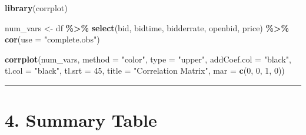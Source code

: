 \documentclass[
]{article}
\newenvironment{Shaded}{\begin{snugshade}}{\end{snugshade}}
\newcommand{\AttributeTok}[1]{\textcolor[rgb]{0.13,0.29,0.53}{#1}}
\newcommand{\DecValTok}[1]{\textcolor[rgb]{0.00,0.00,0.81}{#1}}
\newcommand{\FunctionTok}[1]{\textcolor[rgb]{0.13,0.29,0.53}{\textbf{#1}}}
\newcommand{\NormalTok}[1]{#1}
\newcommand{\OtherTok}[1]{\textcolor[rgb]{0.56,0.35,0.01}{#1}}
\newcommand{\SpecialCharTok}[1]{\textcolor[rgb]{0.81,0.36,0.00}{\textbf{#1}}}
\newcommand{\StringTok}[1]{\textcolor[rgb]{0.31,0.60,0.02}{#1}}
\begin{document}
\begin{Shaded}
\begin{Highlighting}[]
\FunctionTok{library}\NormalTok{(corrplot)}

\NormalTok{num\_vars }\OtherTok{\textless{}{-}}\NormalTok{ df }\SpecialCharTok{\%\textgreater{}\%}
  \FunctionTok{select}\NormalTok{(bid, bidtime, bidderrate, openbid, price) }\SpecialCharTok{\%\textgreater{}\%}
  \FunctionTok{cor}\NormalTok{(}\AttributeTok{use =} \StringTok{"complete.obs"}\NormalTok{)}

\FunctionTok{corrplot}\NormalTok{(num\_vars,}
         \AttributeTok{method  =} \StringTok{"color"}\NormalTok{,}
         \AttributeTok{type    =} \StringTok{"upper"}\NormalTok{,}
         \AttributeTok{addCoef.col =} \StringTok{"black"}\NormalTok{,}
         \AttributeTok{tl.col  =} \StringTok{"black"}\NormalTok{,}
         \AttributeTok{tl.srt  =} \DecValTok{45}\NormalTok{,}
         \AttributeTok{title   =} \StringTok{"Correlation Matrix"}\NormalTok{,}
         \AttributeTok{mar     =} \FunctionTok{c}\NormalTok{(}\DecValTok{0}\NormalTok{, }\DecValTok{0}\NormalTok{, }\DecValTok{1}\NormalTok{, }\DecValTok{0}\NormalTok{))}
\end{Highlighting}
\end{Shaded}

\begin{center}\rule{0.5\linewidth}{0.5pt}\end{center}

\section{4. Summary Table}\label{summary-table}
\end{document}

